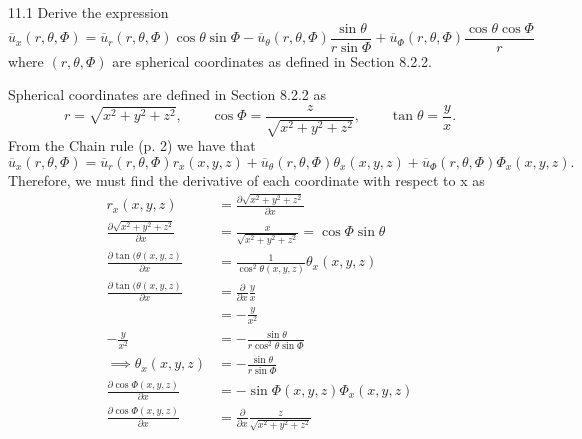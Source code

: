 
\begin{problem}{11.1}
  Derive the expression
  \begin{equation*}
    \overline{u}_x (r, \theta, \Phi) = \overline{u}_r (r, \theta, \Phi) \cos \theta \sin \Phi - \overline{u}_{\theta} (r, \theta, \Phi) \frac{\sin \theta}{r \sin \Phi} + \overline{u}_{\Phi} (r, \theta, \Phi) \frac{\cos \theta \cos \Phi}{r}
  \end{equation*}
  where $(r, \theta, \Phi)$ are spherical coordinates as defined in Section 8.2.2.
\end{problem}

\begin{derivation}
  Spherical coordinates are defined in Section 8.2.2 as
  \begin{equation*}
    r = \sqrt{x^2 + y^2 + z^2}, \qquad \cos \Phi = \frac{z}{\sqrt{x^2 + y^2 + z^2}}, \qquad \tan \theta = \frac{y}{x}
  .\end{equation*}
  From the Chain rule (p. 2) we have that
  \begin{equation*}
    \overline{u}_x (r, \theta, \Phi) = \overline{u}_r (r, \theta, \Phi) r_x(x,y,z) + \overline{u}_{\theta} (r, \theta, \Phi) \theta_x(x,y,z) + \overline{u}_{\Phi}(r, \theta, \Phi) \Phi_x(x,y,z)
  .\end{equation*}
  Therefore, we must find the derivative of each coordinate with respect to x as
  \begin{align*}
    r_x(x,y,z) &= \frac{\partial \sqrt{x^2 + y^2 + z^2}}{\partial x} \\
    \frac{\partial \sqrt{x^2 + y^2 + z^2}}{\partial x} &= \frac{x}{\sqrt{x^2+y^2+z^2}} = \cos \Phi \sin \theta \\
    \frac{\partial \tan (\theta(x,y,z)}{\partial x} &= \frac{1}{\cos^2 \theta(x,y,z)} \theta_x(x,y,z) \\
    \frac{\partial \tan (\theta(x,y,z)}{\partial x} &= \frac{\partial }{\partial x} \frac{y}{x} \\
       &= -\frac{y}{x^2} \\
       - \frac{y}{x^2} &= - \frac{\sin \theta}{r \cos^2 \theta \sin \Phi} \\
       \implies \theta_{x}(x,y,z) &= - \frac{\sin \theta}{r \sin \Phi} \\
       \frac{\partial \cos \Phi(x,y,z)}{\partial x} &= - \sin \Phi(x,y,z) \Phi_x(x,y,z) \\
       \frac{\partial \cos \Phi(x,y,z)}{\partial x} &= \frac{\partial }{\partial x} \frac{z}{\sqrt{x^2 + y^2 + z^2}} \\

\end{align*}
\end{derivation}
